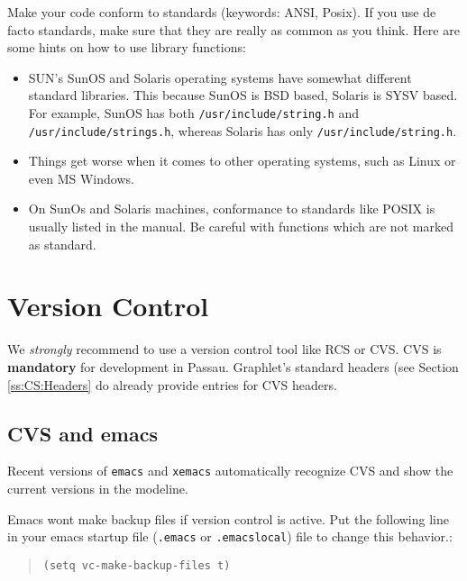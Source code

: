 Make your code conform to standards (keywords: ANSI, Posix).  If
you use de facto standards, make sure that they are really as
common as you think.  Here are some hints on how to use library
functions:

\begin{itemize}
  
  \item SUN's SunOS and Solaris operating systems have somewhat
  different standard libraries.  This because SunOS is BSD based,
  Solaris is SYSV based.  For example, SunOS has both
  \texttt{/usr/include/string.h} and
  \texttt{/usr/include/strings.h}, whereas Solaris has only
  \texttt{/usr/include/string.h}.
  
  \item Things get worse when it comes to other operating
  systems, such as Linux or even MS Windows.
  
  \item On SunOs and Solaris machines, conformance to standards
  like POSIX is usually listed in the manual.  Be careful with
  functions which are not marked as standard.

\end{itemize}


%
%

\section{Version Control}
\label{s:CS:VersionControl}

We \emph{strongly} recommend to use a version control tool like
RCS or CVS. CVS is \textbf{mandatory} for development in Passau.
Graphlet's standard headers (see Section \ref{ss:CS:Headers} do
already provide entries for CVS headers.



\subsection{CVS and emacs}

Recent versions of \texttt{emacs} and \texttt{xemacs}
automatically recognize CVS and show the current versions in the
modeline.

Emacs wont make backup files if version control is active.  Put
the following line in your emacs startup file (\texttt{.emacs} or
\texttt{.emacslocal}) file to change this behavior.:

\begin{quote}
\verb|(setq vc-make-backup-files t)|
\end{quote}

